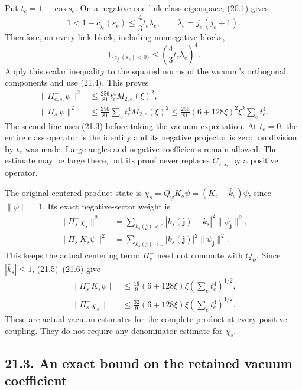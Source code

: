 \documentclass[
]{article}
\begin{document}
Put \(t_e=1-\cos s_e\). On a negative one-link class eigenspace, (20.1)
gives \[
1<1-c_{j_e}(s_e)\le\frac43t_e\lambda_e,\qquad
\lambda_e=j_e(j_e+1).
\] Therefore, on every link block, including nonnegative blocks, \[
\mathbf1_{\{c_{j_e}(s_e)<0\}}
 \le \left(\frac43t_e\lambda_e\right)^4 .
\] Apply this scalar inequality to the squared norms of the vacuum's
orthogonal components and use (21.4). This proves \[
\begin{aligned}
\|\Pi_{e,s_e}^-\psi\|^2
 &\le\frac{256}{81}t_e^4M_{2,e}(\xi)^2,\\
\|\Pi_s^-\psi\|^2
 &\le\frac{256}{81}\sum_e t_e^4M_{2,e}(\xi)^2
 \le\frac{256}{81}(6+128\xi)^2\xi^2\sum_e t_e^4 .
\end{aligned}                                                 \tag{21.5}
\] The second line uses (21.3) before taking the vacuum expectation. At
\(t_e=0\), the entire class operator is the identity and its negative
projector is zero; no division by \(t_e\) was made. Large angles and
negative coefficients remain allowed. The estimate may be large there,
but its proof never replaces \(C_{e,s_e}\) by a positive operator.

The original centered product state is
\(\chi_s=Q_\psi K_s\psi=(K_s-\bar k_s)\psi\), since \(\|\psi\|=1\). Its
exact negative-sector weight is \[
\begin{aligned}
\|\Pi_s^-\chi_s\|^2
 &=\sum_{k_s(\boldsymbol j)<0}
       |k_s(\boldsymbol j)-\bar k_s|^2
                     \|\psi_{\boldsymbol j}\|^2,\\
\|\Pi_s^-K_s\psi\|^2
 &=\sum_{k_s(\boldsymbol j)<0}
       |k_s(\boldsymbol j)|^2\|\psi_{\boldsymbol j}\|^2 .
\end{aligned}                                                 \tag{21.6}
\] This keeps the actual centering term: \(\Pi_s^-\) need not commute
with \(Q_\psi\). Since \(|\bar k_s|\le1\), (21.5)--(21.6) give \[
\begin{aligned}
\|\Pi_s^-K_s\psi\|&\le
 \frac{16}{9}(6+128\xi)\xi\left(\sum_et_e^4\right)^{1/2},\\
\|\Pi_s^-\chi_s\|&\le
 \frac{32}{9}(6+128\xi)\xi\left(\sum_et_e^4\right)^{1/2}.
\end{aligned}                                                 \tag{21.7}
\] These are actual-vacuum estimates for the complete product at every
positive coupling. They do not require any denominator estimate for
\(\chi_s\).

\subsection{21.3. An exact bound on the retained vacuum
coefficient}\label{an-exact-bound-on-the-retained-vacuum-coefficient}
\end{document}
